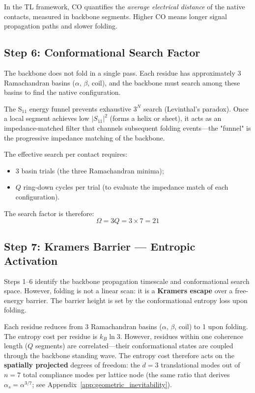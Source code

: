 In the TL framework, CO quantifies the \emph{average electrical distance} of the native contacts, measured in backbone segments.  Higher CO means longer signal propagation paths and slower folding.

\subsection{Step 6: Conformational Search Factor}
\label{sec:search_factor}

The backbone does not fold in a single pass.
Each residue has approximately 3 Ramachandran basins ($\alpha$, $\beta$, coil), and the backbone must search among these basins to find the native configuration.

The S$_{11}$ energy funnel prevents exhaustive $3^N$ search (Levinthal's paradox).
Once a local segment achieves low $|S_{11}|^2$ (forms a helix or sheet), it acts as an impedance-matched filter that channels subsequent folding events---the "funnel" is the progressive impedance matching of the backbone.

The effective search per contact requires:
\begin{itemize}
    \item 3 basin trials (the three Ramachandran minima);
    \item $Q$ ring-down cycles per trial (to evaluate the impedance match of each configuration).
\end{itemize}
The search factor is therefore:
\begin{equation}
    \Omega = 3Q = 3 \times 7 = 21
    \label{eq:omega_search}
\end{equation}

\subsection{Step 7: Kramers Barrier --- Entropic Activation}
\label{sec:kramers_barrier}

Steps 1--6 identify the backbone propagation timescale and conformational search space.
However, folding is not a linear scan: it is a \textbf{Kramers escape} over a free-energy barrier.
The barrier height is set by the conformational entropy loss upon folding.

Each residue reduces from 3 Ramachandran basins ($\alpha$, $\beta$, coil) to 1 upon folding.
The entropy cost per residue is $k_B \ln 3$.
However, residues within one coherence length ($Q$ segments) are correlated---their conformational states are coupled through the backbone standing wave.
The entropy cost therefore acts on the \textbf{spatially projected} degrees of freedom: the $d = 3$ translational modes out of $n = 7$ total compliance modes per lattice node (the same ratio that derives $\alpha_s = \alpha^{3/7}$; see Appendix~\ref{app:geometric_inevitability}).

